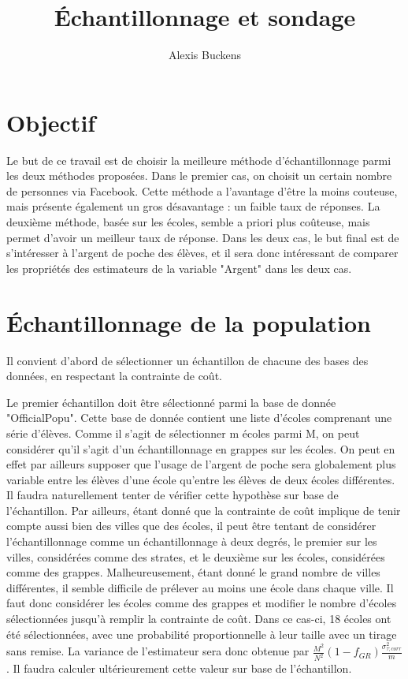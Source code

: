 \documentclass[11pt,a4paper]{report}
\author{Alexis Buckens }
\title{Échantillonnage et sondage}
\begin{document}
\maketitle

\section*{Objectif}

Le but de ce travail est de choisir la meilleure méthode d'échantillonnage parmi les deux méthodes proposées. Dans le premier cas, on choisit un certain nombre de personnes via Facebook. Cette méthode a l'avantage d'être la moins couteuse, mais présente également un gros désavantage : un faible taux de réponses. La deuxième méthode, basée sur les écoles, semble a priori plus coûteuse, mais permet d'avoir un meilleur taux de réponse. Dans les deux cas, le but final est de s'intéresser à l'argent de poche des élèves, et il sera donc intéressant de comparer les propriétés des estimateurs de la variable "Argent" dans les deux cas.

\section*{Échantillonnage de la population}

Il convient d'abord de sélectionner un échantillon de chacune des bases des données, en respectant la contrainte de coût.\bigskip

Le premier échantillon doit être sélectionné parmi la base de donnée "OfficialPopu". Cette base de donnée contient une liste d'écoles comprenant une série d'élèves. Comme il s'agit de sélectionner m écoles parmi M, on peut considérer qu'il s'agit d'un échantillonnage en grappes sur les écoles. On peut en effet par ailleurs supposer que l'usage de l'argent de poche sera globalement plus variable entre les élèves d'une école qu'entre les élèves de deux écoles différentes. Il faudra naturellement tenter de vérifier cette hypothèse sur base de l'échantillon. Par ailleurs, étant donné que la contrainte de coût implique de tenir compte aussi bien des villes que des écoles, il peut être tentant de considérer l'échantillonnage comme un échantillonnage à deux degrés, le premier sur les villes, considérées comme des strates, et le deuxième sur les écoles, considérées comme des grappes. Malheureusement, étant donné le grand nombre de villes différentes, il semble difficile de prélever au moins une école dans chaque ville. Il faut donc considérer les écoles comme des grappes et modifier le nombre d'écoles sélectionnées jusqu'à remplir la contrainte de coût. Dans ce cas-ci, 18 écoles ont été sélectionnées, avec une probabilité proportionnelle à leur taille avec un tirage sans remise. La variance de l'estimateur sera donc obtenue par $\frac{M^2}{N^2} (1-f_{GR})\frac{\sigma_{\tau;corr}^2}{m}$. Il faudra calculer ultérieurement cette valeur sur base de l'échantillon.\bigskip
\end{document}

